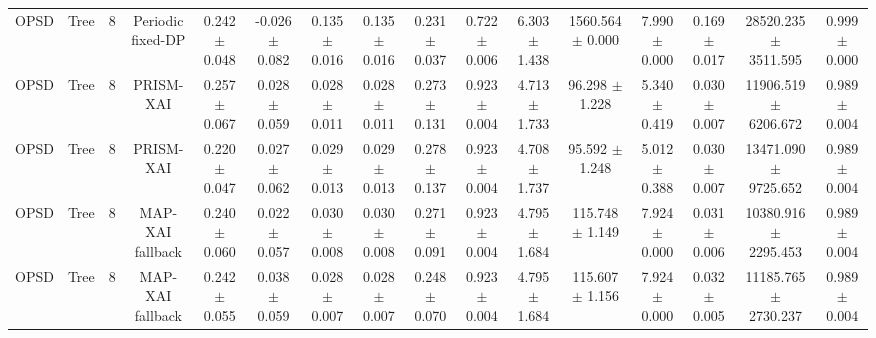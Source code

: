 \begin{tabular}{lccccccccccccccc}
OPSD & Tree & 8 & Periodic fixed-DP & 0.242 $\pm$ 0.048 & -0.026 $\pm$ 0.082 & 0.135 $\pm$ 0.016 & 0.135 $\pm$ 0.016 & 0.231 $\pm$ 0.037 & 0.722 $\pm$ 0.006 & 6.303 $\pm$ 1.438 & 1560.564 $\pm$ 0.000 & 7.990 $\pm$ 0.000 & 0.169 $\pm$ 0.017 & 28520.235 $\pm$ 3511.595 & 0.999 $\pm$ 0.000 \\
OPSD & Tree & 8 & PRISM-XAI & 0.257 $\pm$ 0.067 & 0.028 $\pm$ 0.059 & 0.028 $\pm$ 0.011 & 0.028 $\pm$ 0.011 & 0.273 $\pm$ 0.131 & 0.923 $\pm$ 0.004 & 4.713 $\pm$ 1.733 & 96.298 $\pm$ 1.228 & 5.340 $\pm$ 0.419 & 0.030 $\pm$ 0.007 & 11906.519 $\pm$ 6206.672 & 0.989 $\pm$ 0.004 \\
OPSD & Tree & 8 & PRISM-XAI & 0.220 $\pm$ 0.047 & 0.027 $\pm$ 0.062 & 0.029 $\pm$ 0.013 & 0.029 $\pm$ 0.013 & 0.278 $\pm$ 0.137 & 0.923 $\pm$ 0.004 & 4.708 $\pm$ 1.737 & 95.592 $\pm$ 1.248 & 5.012 $\pm$ 0.388 & 0.030 $\pm$ 0.007 & 13471.090 $\pm$ 9725.652 & 0.989 $\pm$ 0.004 \\
OPSD & Tree & 8 & MAP-XAI fallback & 0.240 $\pm$ 0.060 & 0.022 $\pm$ 0.057 & 0.030 $\pm$ 0.008 & 0.030 $\pm$ 0.008 & 0.271 $\pm$ 0.091 & 0.923 $\pm$ 0.004 & 4.795 $\pm$ 1.684 & 115.748 $\pm$ 1.149 & 7.924 $\pm$ 0.000 & 0.031 $\pm$ 0.006 & 10380.916 $\pm$ 2295.453 & 0.989 $\pm$ 0.004 \\
OPSD & Tree & 8 & MAP-XAI fallback & 0.242 $\pm$ 0.055 & 0.038 $\pm$ 0.059 & 0.028 $\pm$ 0.007 & 0.028 $\pm$ 0.007 & 0.248 $\pm$ 0.070 & 0.923 $\pm$ 0.004 & 4.795 $\pm$ 1.684 & 115.607 $\pm$ 1.156 & 7.924 $\pm$ 0.000 & 0.032 $\pm$ 0.005 & 11185.765 $\pm$ 2730.237 & 0.989 $\pm$ 0.004 \\
\bottomrule
\end{tabular}
